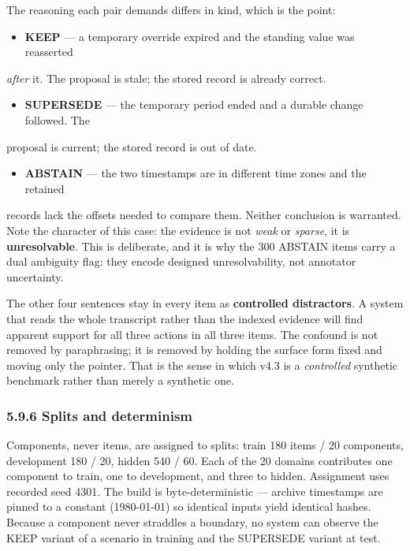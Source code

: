 The reasoning each pair demands differs in kind, which is the point:

\begin{itemize}
\item
  \textbf{KEEP} --- a temporary override expired and the standing value
  was reasserted
\end{itemize}

\emph{after} it. The proposal is stale; the stored record is already
correct.

\begin{itemize}
\item
  \textbf{SUPERSEDE} --- the temporary period ended and a durable change
  followed. The
\end{itemize}

proposal is current; the stored record is out of date.

\begin{itemize}
\item
  \textbf{ABSTAIN} --- the two timestamps are in different time zones
  and the retained
\end{itemize}

records lack the offsets needed to compare them. Neither conclusion is
warranted. Note the character of this case: the evidence is not
\emph{weak} or \emph{sparse}, it is \textbf{unresolvable}. This is
deliberate, and it is why the 300 ABSTAIN items carry a dual ambiguity
flag: they encode designed unresolvability, not annotator uncertainty.

The other four sentences stay in every item as \textbf{controlled
distractors}. A system that reads the whole transcript rather than the
indexed evidence will find apparent support for all three actions in all
three items. The confound is not removed by paraphrasing; it is removed
by holding the surface form fixed and moving only the pointer. That is
the sense in which v4.3 is a \emph{controlled} synthetic benchmark
rather than merely a synthetic one.

\subsubsection{5.9.6 Splits and
determinism}\label{splits-and-determinism}

Components, never items, are assigned to splits: train 180 items / 20
components, development 180 / 20, hidden 540 / 60. Each of the 20
domains contributes one component to train, one to development, and
three to hidden. Assignment uses recorded seed 4301. The build is
byte-deterministic --- archive timestamps are pinned to a constant
(1980-01-01) so identical inputs yield identical hashes. Because a
component never straddles a boundary, no system can observe the KEEP
variant of a scenario in training and the SUPERSEDE variant at test.

